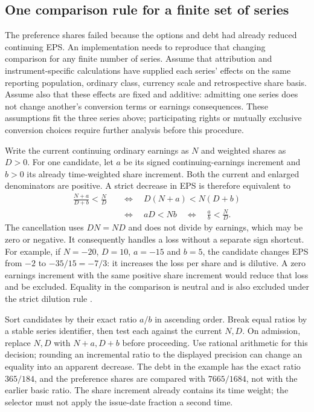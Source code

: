 \subsection{One comparison rule for a finite set of series}
\label{sec:ordered-eps-method}

The preference shares failed because the options and debt had already reduced
continuing EPS. An implementation needs to reproduce that changing comparison
for any finite number of series. Assume that attribution and instrument-specific
calculations have supplied each series' effects on the same reporting
population, ordinary class, currency scale and retrospective share basis.
Assume also that these effects are fixed and additive: admitting one series
does not change another's conversion terms or earnings consequences. These
assumptions fit the three series above; participating rights or mutually
exclusive conversion choices require further analysis before this procedure.

Write the current continuing ordinary earnings as $N$ and weighted shares
as $D>0$. For one candidate, let $a$ be its signed continuing-earnings
increment and $b>0$ its already time-weighted share increment. Both the
current and enlarged denominators are positive. A strict decrease in EPS is
therefore equivalent to
\begin{align*}
 \frac{N+a}{D+b}<\frac ND
 &\quad\Longleftrightarrow\quad D(N+a)<N(D+b)\\
 &\quad\Longleftrightarrow\quad aD<Nb
 \quad\Longleftrightarrow\quad \frac ab<\frac ND.
\end{align*}
The cancellation uses $DN=ND$ and does not divide by earnings, which may be
zero or negative. It consequently handles a loss without a separate sign
shortcut. For example, if $N=-20$, $D=10$, $a=-15$ and $b=5$, the candidate
changes EPS from $-2$ to $-35/15=-7/3$: it increases the loss per share and
is dilutive. A zero earnings increment with the same positive share increment
would reduce that loss and be excluded. Equality in the comparison is neutral
and is also excluded under the strict dilution rule
\citep[IAS~33, paragraphs 41--44]{eu20231803}.

Sort candidates by their exact ratio $a/b$ in ascending order. Break equal
ratios by a stable series identifier, then test each against the current
$N,D$. On admission, replace $N,D$ with $N+a,D+b$ before proceeding.
Use rational arithmetic for this decision; rounding an incremental ratio to
the displayed precision can change an equality into an apparent decrease.
The debt in the example has the exact ratio $365/184$, and the preference
shares are compared with $7665/1684$, not with the earlier basic ratio.
The share increment already contains its time weight; the selector must not
apply the issue-date fraction a second time.

